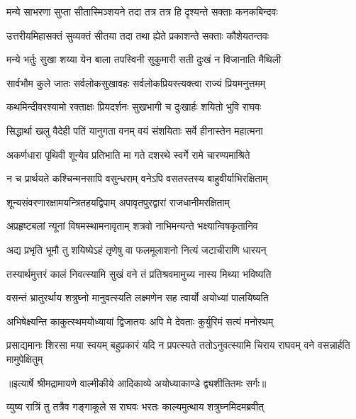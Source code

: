 \twolineshloka
{मन्ये साभरणा सुप्ता सीतास्मिञ्शयने तदा}
{तत्र तत्र हि दृश्यन्ते सक्ताः कनकबिन्दवः} %

\twolineshloka
{उत्तरीयमिहासक्तं सुव्यक्तं सीतया तदा}
{तथा ह्येते प्रकाशन्ते सक्ताः कौशेयतन्तवः} %

\twolineshloka
{मन्ये भर्तुः सुखा शय्या येन बाला तपस्विनी}
{सुकुमारी सती दुःखं न विजानाति मैथिली} %

\twolineshloka
{सार्वभौम कुले जातः सर्वलोकसुखावहः}
{सर्वलोकप्रियस्त्यक्त्वा राज्यं प्रियमनुत्तमम्} %

\twolineshloka
{कथमिन्दीवरश्यामो रक्ताक्षः प्रियदर्शनः}
{सुखभागी च दुःखार्हः शयितो भुवि राघवः} %

\twolineshloka
{सिद्धार्था खलु वैदेही पतिं यानुगता वनम्}
{वयं संशयिताः सर्वे हीनास्तेन महात्मना} %

\twolineshloka
{अकर्णधारा पृथिवी शून्येव प्रतिभाति मा}
{गते दशरथे स्वर्गे रामे चारण्यमाश्रिते} %

\twolineshloka
{न च प्रार्थयते कश्चिन्मनसापि वसुन्धराम्}
{वनेऽपि वसतस्तस्य बाहुवीर्याभिरक्षिताम्} %

\twolineshloka
{शून्यसंवरणारक्षामयन्त्रितहयद्विपाम्}
{अपावृतपुरद्वारां राजधानीमरक्षिताम्} %

\twolineshloka
{अप्रहृष्टबलां न्यूनां विषमस्थामनावृताम्}
{शत्रवो नाभिमन्यन्ते भक्ष्यान्विषकृतानिव} %

\twolineshloka
{अद्य प्रभृति भूमौ तु शयिष्येऽहं तृणेषु वा}
{फलमूलाशनो नित्यं जटाचीराणि धारयन्} %

\twolineshloka
{तस्यार्थमुत्तरं कालं निवत्स्यामि सुखं वने}
{तं प्रतिश्रवमामुच्य नास्य मिथ्या भविष्यति} %

\twolineshloka
{वसन्तं भ्रातुरर्थाय शत्रुघ्नो मानुवत्स्यति}
{लक्ष्मणेन सह त्वार्यो अयोध्यां पालयिष्यति} %

\twolineshloka
{अभिषेक्ष्यन्ति काकुत्स्थमयोध्यायां द्विजातयः}
{अपि मे देवताः कुर्युरिमं सत्यं मनोरथम्} %

\fourlineindentedshloka
{प्रसाद्यमानः शिरसा मया स्वयम्}
{बहुप्रकारं यदि न प्रपत्स्यते}
{ततोऽनुवत्स्यामि चिराय राघवम्}
{वने वसन्नार्हति मामुपेक्षितुम्} %


{॥इत्यार्षे श्रीमद्रामायणे वाल्मीकीये आदिकाव्ये अयोध्याकाण्डे द्व्यशीतितमः सर्गः॥}


\twolineshloka
{व्युष्य रात्रिं तु तत्रैव गङ्गाकूले स राघवः}
{भरतः काल्यमुत्थाय शत्रुघ्नमिदमब्रवीत्} %

